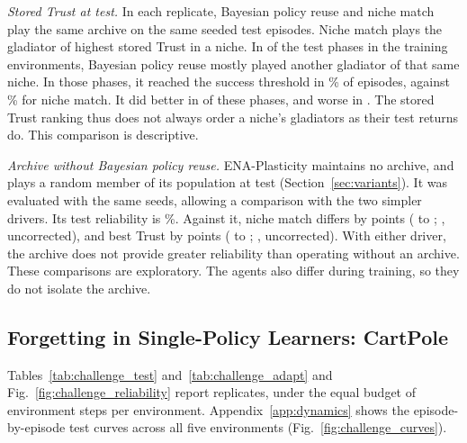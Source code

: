 \textit{Stored Trust at test.} In each replicate, Bayesian policy reuse and niche match play the same archive on the same seeded test episodes. Niche match plays the gladiator of highest stored Trust in a niche. In  of the  test phases in the training environments, Bayesian policy reuse mostly played another gladiator of that same niche. In those phases, it reached the success threshold in \% of episodes, against \% for niche match. It did better in  of these phases, and worse in . The stored Trust ranking thus does not always order a niche's gladiators as their test returns do. This comparison is descriptive.

\textit{Archive without Bayesian policy reuse.} ENA-Plasticity maintains no archive, and plays a random member of its population at test (Section~\ref{sec:variants}). It was evaluated with the same seeds, allowing a comparison with the two simpler drivers. Its test reliability is \%. Against it, niche match differs by  points ( to ; , uncorrected), and best Trust by  points ( to ; , uncorrected). With either driver, the archive does not provide greater reliability than operating without an archive. These comparisons are exploratory. The agents also differ during training, so they do not isolate the archive.



\subsection{Forgetting in Single-Policy Learners: CartPole}
\label{sec:forgetting_cartpole}
Tables~\ref{tab:challenge_test} and~\ref{tab:challenge_adapt} and Fig.~\ref{fig:challenge_reliability} report  replicates, under the equal budget of  environment steps per environment. Appendix~\ref{app:dynamics} shows the episode-by-episode test curves across all five environments (Fig.~\ref{fig:challenge_curves}).

